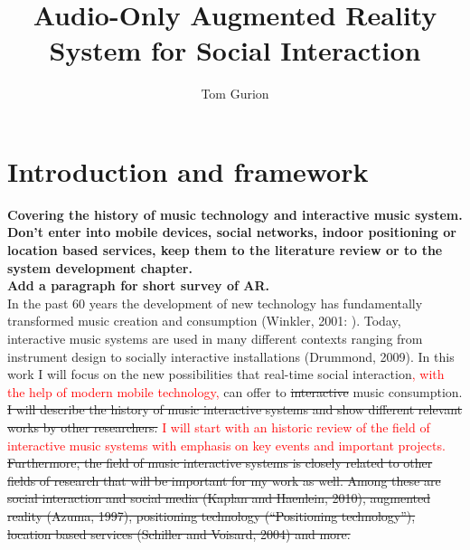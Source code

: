 \documentclass[a4paper,11pt]{article}
\title{Audio-Only Augmented Reality System for Social Interaction}
\author{Tom Gurion}
\begin{document}
\maketitle

\section{Introduction and framework}

\textbf{Covering the history of music technology and interactive music system.\\
Don't enter into mobile devices, social networks, indoor positioning or location based services, keep them to the literature review or to the system development chapter.\\
Add a paragraph for short survey of AR.}\\

In the past 60 years the development of new technology has fundamentally transformed music creation and consumption (Winkler, 2001: ). Today, interactive music systems are used in many different contexts ranging from instrument design to socially interactive installations (Drummond, 2009). In this work I will focus on the new possibilities that real-time social interaction\textcolor{red}{, with the help of modern mobile technology,} can offer to \st{interactive} music consumption. \st{I will describe the history of music interactive systems and show different relevant works by other researchers.} \textcolor{red}{I will start with an historic review of the field of interactive music systems with emphasis on key events and important projects.}\\

\st{Furthermore, the field of music interactive systems is closely related to other fields of research that will be important for my work as well. Among these are social interaction and social media (Kaplan and Haenlein, 2010), augmented reality (Azuma, 1997), positioning technology (``Positioning technology''), location based services (Schiller and Voisard, 2004) and more.}\\
\end{document}
